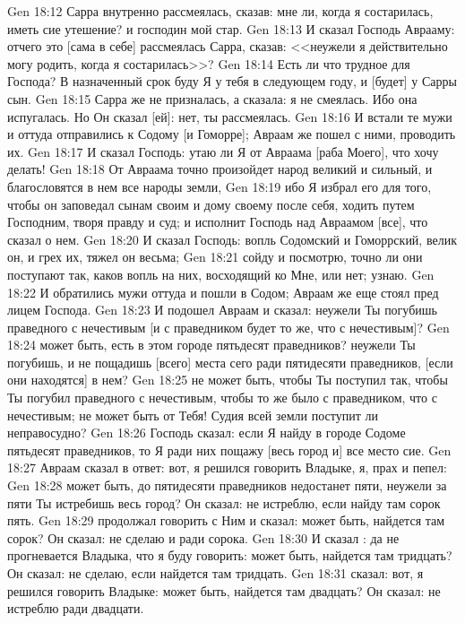 \vs Gen 18:12 Сарра внутренно рассмеялась, сказав: мне ли, когда я состарилась, иметь сие утешение? и господин мой стар.
\vs Gen 18:13 И сказал Господь Аврааму: отчего это [сама в себе] рассмеялась Сарра, сказав: <<неужели я действительно могу родить, когда я состарилась>>?
\vs Gen 18:14 Есть ли что трудное для Господа? В назначенный срок буду Я у тебя в следующем году, и [будет] у Сарры сын.
\vs Gen 18:15 Сарра же не призналась, а сказала: я не смеялась. Ибо она испугалась. Но Он сказал [ей]: нет, ты рассмеялась.
\vs Gen 18:16 И встали те мужи и оттуда отправились к Содому [и Гоморре]; Авраам же пошел с ними, проводить их.
\rsbpar\vs Gen 18:17 И сказал Господь: утаю ли Я от Авраама [раба Моего], что хочу делать!
\vs Gen 18:18 От Авраама точно произойдет народ великий и сильный, и благословятся в нем все народы земли,
\vs Gen 18:19 ибо Я избрал его для того, чтобы он заповедал сынам своим и дому своему после себя, ходить путем Господним, творя правду и суд; и исполнит Господь над Авраамом [все], что сказал о нем.
\vs Gen 18:20 И сказал Господь: вопль Содомский и Гоморрский, велик он, и грех их, тяжел он весьма;
\vs Gen 18:21 сойду и посмотрю, точно ли они поступают так, каков вопль на них, восходящий ко Мне, или нет; узнаю.
\vs Gen 18:22 И обратились мужи оттуда и пошли в Содом; Авраам же еще стоял пред лицем Господа.
\vs Gen 18:23 И подошел Авраам и сказал: неужели Ты погубишь праведного с нечестивым [и с праведником будет то же, что с нечестивым]?
\vs Gen 18:24 может быть, есть в этом городе пятьдесят праведников? неужели Ты погубишь, и не пощадишь [всего] места сего ради пятидесяти праведников, [если они находятся] в нем?
\vs Gen 18:25 не может быть, чтобы Ты поступил так, чтобы Ты погубил праведного с нечестивым, чтобы то же было с праведником, что с нечестивым; не может быть от Тебя! Судия всей земли поступит ли неправосудно?
\vs Gen 18:26 Господь сказал: если Я найду в городе Содоме пятьдесят праведников, то Я ради них пощажу [весь город и] все место сие.
\vs Gen 18:27 Авраам сказал в ответ: вот, я решился говорить Владыке, я, прах и пепел:
\vs Gen 18:28 может быть, до пятидесяти праведников недостанет пяти, неужели за  пяти Ты истребишь весь город? Он сказал: не истреблю, если найду там сорок пять.
\vs Gen 18:29  продолжал говорить с Ним и сказал: может быть, найдется там сорок? Он сказал: не сделаю  и ради сорока.
\vs Gen 18:30 И сказал : да не прогневается Владыка, что я буду говорить: может быть, найдется там тридцать? Он сказал: не сделаю, если найдется там тридцать.
\vs Gen 18:31  сказал: вот, я решился говорить Владыке: может быть, найдется там двадцать? Он сказал: не истреблю ради двадцати.
